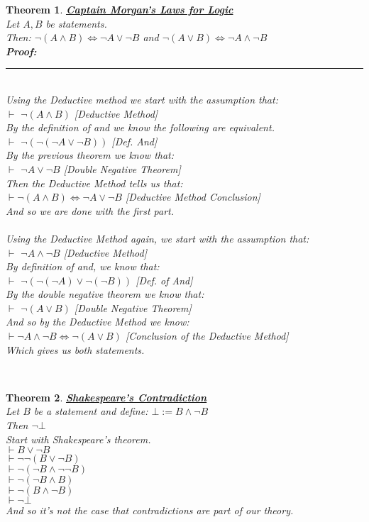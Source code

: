 \documentclass[12pt]{extarticle}
\theoremstyle{plain}
\newtheorem{thm}{Theorem}[section]
\theoremstyle{plain}
\theoremstyle{plain}
\theoremstyle{Definition}
\theoremstyle{Definition}
\theoremstyle{plain}
\theoremstyle{plain}
\newcommand{\cut}[0]{\noindent\framebox[\linewidth]{\rule{\linewidth}{2pt}}\\}
\newcommand{\prof}[0]{	\noindent \textbf{Proof:} \rule{500pt}{2pt} \\ }
\newcommand{\ddash}{\boxed{\vdash}}
\begin{document}
\begin{thm} \underline{\textbf{Captain Morgan's Laws for Logic}} \\ 
	Let $A,B$ be statements. \\ 
	Then: $\lnot(A \land B) \Leftrightarrow \lnot A \lor \lnot B$ and $\lnot(A \lor B) \Leftrightarrow \lnot A \land \lnot B$ \\
	\prof
	Using the Deductive method we start with the assumption that: \\
	$\ddash$ $\lnot(A \land B)$ \hfill [Deductive Method] \\
	By the definition of and we know the following are equivalent. \\ 
	$\ddash$ $\lnot( \lnot( \lnot A \lor \lnot B) )$ \hfill [Def. And] \\ 
	By the previous theorem we know that: \\ 
	$\ddash$ $\lnot A \lor \lnot B$ \hfill [Double Negative Theorem] \\ 
	Then the Deductive Method tells us that: \\ 
	$\vdash \lnot(A \land B) \Leftrightarrow \lnot A \lor \lnot B$ \hfill [Deductive Method Conclusion] \\
	And so we are done with the first part. \\ \\
	Using the Deductive Method again, we start with the assumption that: \\ 
	$\ddash$ $ \lnot A \land \lnot B$ \hfill [Deductive Method] \\
	By definition of and, we know that: \\ 
	$\ddash$ $\lnot (\lnot (\lnot A) \lor \lnot (\lnot B)) $ \hfill [Def. of And] \\ 
	By the double negative theorem we know that: \\ 
	$\ddash$ $\lnot (A \lor B)$ \hfill [Double Negative Theorem] \\
	And so by the Deductive Method we know: \\ 
	$\vdash \lnot A \land \lnot B \Leftrightarrow \lnot (A \lor B)$ \hfill [Conclusion of the Deductive Method] \\
	Which gives us both statements. 
\end{thm}
\cut 
\begin{thm} \underline{\textbf{Shakespeare's Contradiction}} \\
	Let $B$ be a statement and define: 
	$\bot  := B \wedge \lnot B$ \\
	Then $\lnot \bot$ \\ 
	Start with Shakespeare's theorem. \\ 
	$\vdash B \lor \lnot B$ \\ 
	$\vdash \lnot \lnot (B \lor \lnot B)$ \\ 
	$\vdash \lnot (\lnot B \land \lnot \lnot B)$ \\ 
	$\vdash \lnot (\lnot B \land B)$ \\
	$\vdash \lnot (B \wedge \lnot B)$ \\
	$\vdash \lnot \bot$ \\
	And so it's not the case that contradictions are part of our theory.  
\end{thm}
\end{document}
